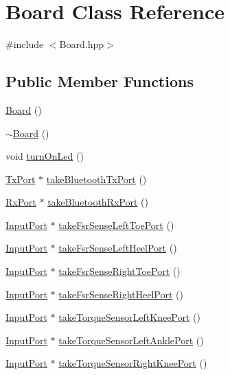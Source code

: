 \hypertarget{classBoard}{}\section{Board Class Reference}
\label{classBoard}


{\ttfamily \#include $<$Board.\+hpp$>$}

\subsection*{Public Member Functions}
\begin{DoxyCompactItemize}
\item 
\hyperlink{classBoard_a9ee491d4fea680cf69b033374a9fdfcb}{Board} ()
\item 
\hyperlink{classBoard_af73f45730119a1fd8f6670f53f959e68}{$\sim$\+Board} ()
\item 
void \hyperlink{classBoard_a022ee938df244ab52f8ce4c3541a7600}{turn\+On\+Led} ()
\item 
\hyperlink{classTxPort}{Tx\+Port} $\ast$ \hyperlink{classBoard_a4d2aeef1855a94949426a0004da0d206}{take\+Bluetooth\+Tx\+Port} ()
\item 
\hyperlink{classRxPort}{Rx\+Port} $\ast$ \hyperlink{classBoard_a3b0eb16b49af6cecd2615ddebb301a83}{take\+Bluetooth\+Rx\+Port} ()
\item 
\hyperlink{classInputPort}{Input\+Port} $\ast$ \hyperlink{classBoard_af30a08ff2ff3e86e290d8c512907a422}{take\+Fsr\+Sense\+Left\+Toe\+Port} ()
\item 
\hyperlink{classInputPort}{Input\+Port} $\ast$ \hyperlink{classBoard_a21da1fccb5bb27ade658cbfdf05a64f9}{take\+Fsr\+Sense\+Left\+Heel\+Port} ()
\item 
\hyperlink{classInputPort}{Input\+Port} $\ast$ \hyperlink{classBoard_a78a9a73532be37ed05d6d2f12e5b7182}{take\+Fsr\+Sense\+Right\+Toe\+Port} ()
\item 
\hyperlink{classInputPort}{Input\+Port} $\ast$ \hyperlink{classBoard_acea5ca8cba177d604319585260afb1b8}{take\+Fsr\+Sense\+Right\+Heel\+Port} ()
\item 
\hyperlink{classInputPort}{Input\+Port} $\ast$ \hyperlink{classBoard_a77deee0229cdc90dfba844f733738548}{take\+Torque\+Sensor\+Left\+Knee\+Port} ()
\item 
\hyperlink{classInputPort}{Input\+Port} $\ast$ \hyperlink{classBoard_a4a3194002b85e3adea633d849964ce54}{take\+Torque\+Sensor\+Left\+Ankle\+Port} ()
\item 
\hyperlink{classInputPort}{Input\+Port} $\ast$ \hyperlink{classBoard_a425a898e1ebbf15cbb9198f723d8279b}{take\+Torque\+Sensor\+Right\+Knee\+Port} ()

\end{DoxyCompactItemize}
